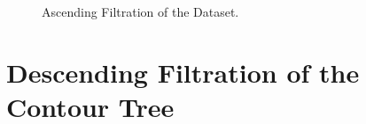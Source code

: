 \begin{appendices}
\begin{figure}[h]

    \caption{Ascending Filtration of the Dataset.}%
    \label{fig:asc-filtration-tree}%
\end{figure}


\chapter{Descending Filtration of the Contour Tree}
\label{chapter-desc}


\end{appendices}
